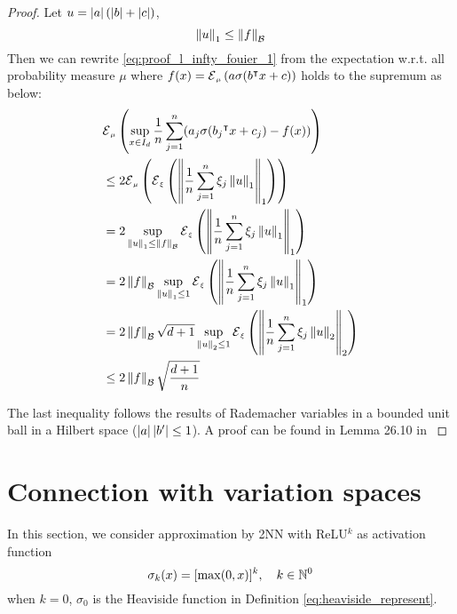 \begin{proof}
    Let $u = \left| a \right| (\left| b \right| + \left| c \right|)$,
    \begin{equation}
        \left\| u \right\|_1 \leq \left\| f \right\|_{\mathcal{B}}      
    \end{equation}
    Then we can rewrite \eqref{eq:proof_l_infty_fouier_1} from the expectation
    w.r.t. all probability measure $\mu$ where $f(x) = \ERWi{\mu}{a \sigma(b\tr
    x + c)}$ holds to the supremum as below: 
    \begin{align}
        &\ERWi{\mu}{\sup_{x\in I_d} 
        \frac{1}{n} \sum_{j=1}^n (a_j\sigma(b_j\tr x + c_j) - f(x))} \\
        &\leq 2\ERWi{\mu}{
                \ERWi{\xi}{\norm{
                \frac{1}{n} \sum_{j=1}^{n}\xi_j \norm{u}_1}_1
            }
        } \\
        &= 2\sup_{\norm{u}_1 \leq \norm{f}_{\mcal{B}}} 
            \ERWi{\xi}{\norm{
                \frac{1}{n} \sum_{j=1}^{n}\xi_j\norm{u}_1}_1
            } \\
        &= 2\norm{f}_{\mcal{B}} \sup_{\norm{u}_1 \leq 1} 
            \ERWi{\xi}{\norm{
                \frac{1}{n} \sum_{j=1}^{n}\xi_j\norm{u}_1}_1
            } \\
        &= 2\norm{f}_{\mcal{B}} \sqrt{d+1} \sup_{\norm{u}_2 \leq 1} 
        \ERWi{\xi}{\norm{
            \frac{1}{n} \sum_{j=1}^{n}\xi_j\norm{u}_2}_2
        } \\
        &\leq 2\norm{f}_{\mcal{B}} \sqrt{\frac{d+1}{n}}
    \end{align}

    The last inequality follows the results of Rademacher variables in a bounded
    unit ball in a Hilbert space ($\left| a \right|\left| b' \right| \leq 1$). A proof can be
    found in Lemma 26.10 in \cite[p.
    383]{shalev-shwartzUnderstandingMachineLearning2014}
\end{proof}


\section{Connection with variation spaces}
\label{sec:infintie_width_variation_space}

In this section, we consider approximation by 2NN with ReLU$^k$ as activation
function
\begin{equation}
    \label{eq:reluk}
    \sigma_k(x) = [\max(0, x)]^k, \quad k \in \mathbb{N}^0
\end{equation}
when $k = 0$, $\sigma_0$ is the Heaviside function in Definition
\ref{eq:heaviside_represent}.

